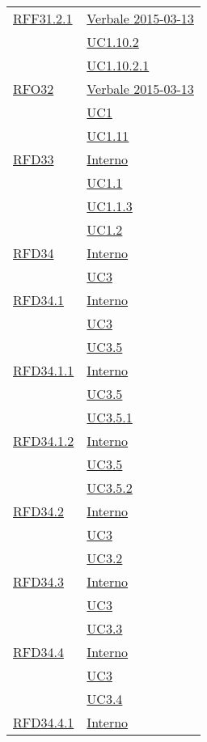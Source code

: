 \begin{longtable}{|>{\centering}m{5cm}|m{5cm}<{\centering}|}
\hyperlink{RFF31.2.1}{RFF31.2.1} & \hyperlink{Verbale 2015-03-13}{Verbale 2015-03-13}\\
& \hyperref[UC1.10.2]{UC1.10.2}\\
& \hyperref[UC1.10.2.1]{UC1.10.2.1}\\ \hline
\hyperlink{RFO32}{RFO32} & \hyperlink{Verbale 2015-03-13}{Verbale 2015-03-13}\\
& \hyperref[UC1]{UC1}\\
& \hyperref[UC1.11]{UC1.11}\\ \hline
\hyperlink{RFD33}{RFD33} & \hyperlink{Interno}{Interno}\\
& \hyperref[UC1.1]{UC1.1}\\
& \hyperref[UC1.1.3]{UC1.1.3}\\
& \hyperref[UC1.2]{UC1.2}\\ \hline
\hyperlink{RFD34}{RFD34} & \hyperlink{Interno}{Interno}\\
& \hyperref[UC3]{UC3}\\ \hline
\hyperlink{RFD34.1}{RFD34.1} & \hyperlink{Interno}{Interno}\\
& \hyperref[UC3]{UC3}\\
& \hyperref[UC3.5]{UC3.5}\\ \hline
\hyperlink{RFD34.1.1}{RFD34.1.1} & \hyperlink{Interno}{Interno}\\
& \hyperref[UC3.5]{UC3.5}\\
& \hyperref[UC3.5.1]{UC3.5.1}\\ \hline
\hyperlink{RFD34.1.2}{RFD34.1.2} & \hyperlink{Interno}{Interno}\\
& \hyperref[UC3.5]{UC3.5}\\
& \hyperref[UC3.5.2]{UC3.5.2}\\ \hline
\hyperlink{RFD34.2}{RFD34.2} & \hyperlink{Interno}{Interno}\\
& \hyperref[UC3]{UC3}\\
& \hyperref[UC3.2]{UC3.2}\\ \hline
\hyperlink{RFD34.3}{RFD34.3} & \hyperlink{Interno}{Interno}\\
& \hyperref[UC3]{UC3}\\
& \hyperref[UC3.3]{UC3.3}\\ \hline
\hyperlink{RFD34.4}{RFD34.4} & \hyperlink{Interno}{Interno}\\
& \hyperref[UC3]{UC3}\\
& \hyperref[UC3.4]{UC3.4}\\ \hline
\hyperlink{RFD34.4.1}{RFD34.4.1} & \hyperlink{Interno}{Interno}\\

\end{longtable}
